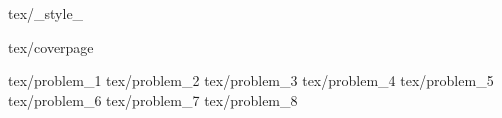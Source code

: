  {tex/_style_}



    \large{}
    
     {tex/coverpage}
    
     {tex/problem_1} %
     {tex/problem_2} %
     {tex/problem_3} %
     {tex/problem_4} %
     {tex/problem_5} %
     {tex/problem_6} %
     {tex/problem_7} %
     {tex/problem_8} %
    
